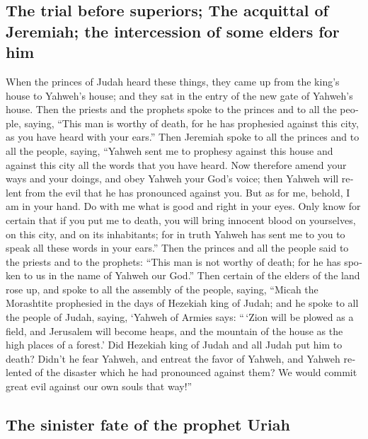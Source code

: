 \begin{paracol}{2}
\begin{otherlanguage}{english}
{\subsection{The trial before superiors; The acquittal of Jeremiah; the
intercession of some elders for
him}\label{the-trial-before-superiors-the-acquittal-of-jeremiah-the-intercession-of-some-elders-for-him}}

 When the princes of Judah heard these things, they came
up from the king's house to Yahweh's house; and they sat in the entry of
the new gate of Yahweh's house.  Then the priests and the
prophets spoke to the princes and to all the people, saying, ``This man
is worthy of death, for he has prophesied against this city, as you have
heard with your ears.''  Then Jeremiah spoke to all the
princes and to all the people, saying, ``Yahweh sent me to prophesy
against this house and against this city all the words that you have
heard.  Now therefore amend your ways and your doings,
and obey Yahweh your God's voice; then Yahweh will relent from the evil
that he has pronounced against you.  But as for me,
behold, I am in your hand. Do with me what is good and right in your
eyes.  Only know for certain that if you put me to death,
you will bring innocent blood on yourselves, on this city, and on its
inhabitants; for in truth Yahweh has sent me to you to speak all these
words in your ears.''  Then the princes and all the
people said to the priests and to the prophets: ``This man is not worthy
of death; for he has spoken to us in the name of Yahweh our God.''
 Then certain of the elders of the land rose up, and
spoke to all the assembly of the people, saying,  ``Micah
the Morashtite prophesied in the days of Hezekiah king of Judah; and he
spoke to all the people of Judah, saying, `Yahweh of Armies says:
``\,`Zion will be plowed as a field, and Jerusalem will become heaps,
and the mountain of the house as the high places of a forest.'
 Did Hezekiah king of Judah and all Judah put him to
death? Didn't he fear Yahweh, and entreat the favor of Yahweh, and
Yahweh relented of the disaster which he had pronounced against them? We
would commit great evil against our own souls that way!''

\hypertarget{the-sinister-fate-of-the-prophet-uriah}{%
\subsection{The sinister fate of the prophet
Uriah}\label{the-sinister-fate-of-the-prophet-uriah}}


\end{otherlanguage}
\end{paracol}
